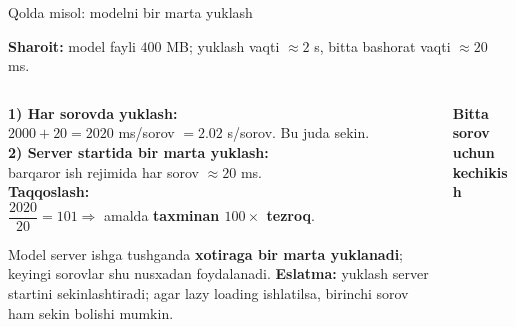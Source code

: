 \documentclass[aspectratio=169,11pt]{beamer}
\newcommand{\uzq}{\textquotesingle{}}   %
\begin{document}
\begin{frame}[t]{Qo\uzq{}lda misol: modelni bir marta yuklash}
  \small
  \vspace{-2mm}

  \begin{tcolorbox}[defbox, boxsep=1pt, left=4pt, right=4pt, top=2pt, bottom=2pt]
    \footnotesize
    \textbf{Sharoit:} model fayli $400$ MB; yuklash vaqti $\approx 2$ s,
    bitta bashorat vaqti $\approx 20$ ms.
  \end{tcolorbox}

  \vspace{2pt}

  \begin{columns}[T,totalwidth=\textwidth]
    \begin{column}{0.48\textwidth}
      \footnotesize

      \textbf{1) Har so\uzq{}rovda yuklash:}\\
      $2000 + 20 = 2020$ ms/so\uzq{}rov
      $= 2.02$ s/so\uzq{}rov. Bu juda sekin.\\[4pt]

      \textbf{2) Server startida bir marta yuklash:}\\
      barqaror ish rejimida har so\uzq{}rov $\approx 20$ ms.\\[4pt]

      \textbf{Taqqoslash:}\\
      $\dfrac{2020}{20}=101 \Rightarrow$
      amalda \textbf{taxminan $100\times$ tezroq}.

      \vspace{4pt}

      \begin{tcolorbox}[okbox, top=2pt, bottom=2pt, left=3pt, right=3pt]
        \scriptsize
        Model server ishga tushganda \textbf{xotiraga bir marta yuklanadi};
        keyingi so\uzq{}rovlar shu nusxadan foydalanadi.
        \textbf{Eslatma:} yuklash server startini sekinlashtiradi;
        agar lazy loading ishlatilsa, birinchi so\uzq{}rov ham sekin bo\uzq{}lishi mumkin.
      \end{tcolorbox}
    \end{column}

    \begin{column}{0.52\textwidth}
  \centering
  {\footnotesize\textbf{Bitta so\uzq{}rov uchun kechikish}}\\[2pt]


\end{column}
\end{columns}
\end{frame}
\end{document}
